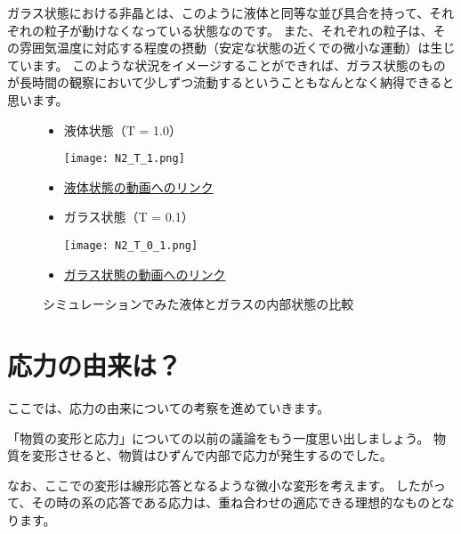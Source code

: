 \documentclass[uplatex,dvipdfmx,a4paper,11pt]{jsarticle}
\begin{document}
ガラス状態における非晶とは、このように液体と同等な並び具合を持って、それぞれの粒子が動けなくなっている状態なのです。
また、それぞれの粒子は、その雰囲気温度に対応する程度の摂動（安定な状態の近くでの微小な運動）は生じています。
このような状況をイメージすることができれば、ガラス状態のものが長時間の観察において少しずつ流動するということもなんとなく納得できると思います。
\begin{figure}[htb]
	\begin{center}
		\begin{minipage}{0.45\textwidth}
			\large
			\begin{itemize}
				\item 液体状態（T = 1.0）

				\texttt{[image: N2\_T\_1.png]}
				\item \href{https://drive.google.com/file/d/1V5lLeoqhoUcujVnHqEzFumDlGXC_rPe-/view?usp=sharing}{液体状態の動画へのリンク}
			\end{itemize}
		\end{minipage}
		\begin{minipage}{0.45\textwidth}
			\large
			\begin{itemize}
				\item ガラス状態（T = 0.1）

				\texttt{[image: N2\_T\_0\_1.png]}
				\item \href{https://drive.google.com/file/d/1HBZ6eQQp0o2vft4bUGxRJUwv4vabs_7d/view?usp=sharing}{ガラス状態の動画へのリンク}
			\end{itemize}
		\end{minipage}
		\caption{シミュレーションでみた液体とガラスの内部状態の比較}
		\label{fig:polymer_glass}
	\end{center}
\end{figure}



\section{応力の由来は？}

ここでは、応力の由来についての考察を進めていきます。

「物質の変形と応力」についての以前の議論をもう一度思い出しましょう。
物質を変形させると、物質はひずんで内部で応力が発生するのでした。

なお、ここでの変形は線形応答となるような微小な変形を考えます。
したがって、その時の系の応答である応力は、重ね合わせの適応できる理想的なものとなります。
\end{document}
